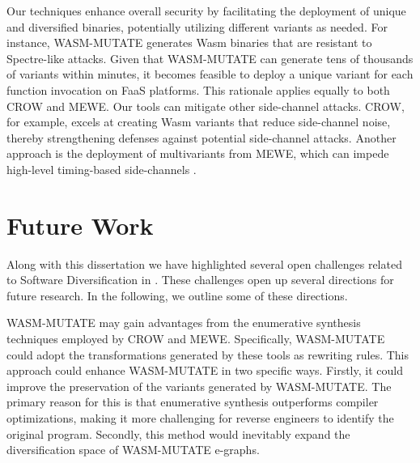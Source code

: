 \begin{strategy}
    Our techniques enhance overall security by facilitating the deployment of unique and diversified \Wasm binaries, potentially utilizing different variants as needed. 
    For instance, WASM-MUTATE generates Wasm binaries that are resistant to Spectre-like attacks. 
    Given that WASM-MUTATE can generate tens of thousands of variants within minutes, it becomes feasible to deploy a unique variant for each function invocation on FaaS platforms. 
    This rationale applies equally to both CROW and MEWE. 
    Our tools can mitigate other side-channel attacks. 
    CROW, for example, excels at creating Wasm variants that reduce side-channel noise, thereby strengthening defenses against potential side-channel attacks. 
    Another approach is the deployment of multivariants from MEWE, which can impede high-level timing-based side-channels \cite{morgan2015web}.
\end{strategy}


\section{Future Work}

Along with this dissertation we have highlighted several open challenges related to Software Diversification in \Wasm.
These challenges open up several directions for future research.
In the following, we outline some of these directions.

\begin{strategy}
WASM-MUTATE may gain advantages from the enumerative synthesis techniques employed by CROW and MEWE. 
Specifically, WASM-MUTATE could adopt the transformations generated by these tools as rewriting rules. 
This approach could enhance WASM-MUTATE in two specific ways. 
Firstly, it could improve the preservation of the variants generated by WASM-MUTATE. 
The primary reason for this is that enumerative synthesis outperforms compiler optimizations, making it more challenging for reverse engineers to identify the original program.
Secondly, this method would inevitably expand the diversification space of WASM-MUTATE e-graphs.
\end{strategy}


